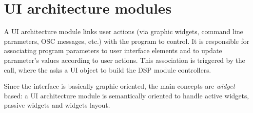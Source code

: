 % 


\section{UI architecture modules} \label{sec:gui}

A UI architecture module links user actions (via graphic widgets, command line parameters, OSC messages, etc.) with the \faust program to control. 
It is responsible for associating program parameters to user interface elements and to update parameter's values according to user actions. This association is triggered by the  call, where the  asks a UI object to build the DSP module controllers.

Since the interface is basically graphic oriented, the main concepts are \emph{widget} based: a UI architecture module is semantically oriented to handle active widgets, passive widgets and widgets layout.


